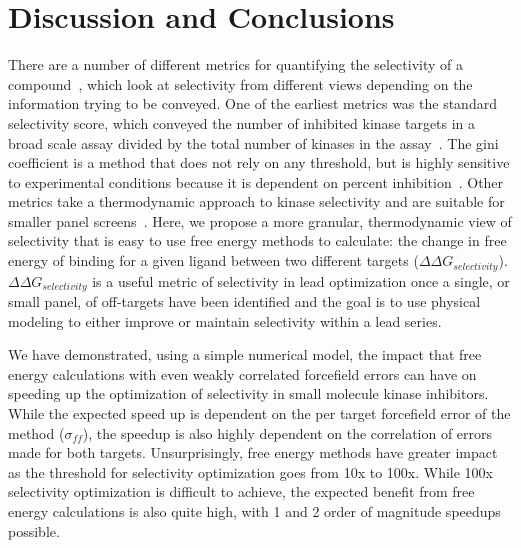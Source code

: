 \documentclass[9pt,lineno]{elife-modified} %
\begin{document}
\section{Discussion and Conclusions}
There are a number of different metrics for quantifying the selectivity of a compound~\citep{Bosc:2017gs}, which look at selectivity from different views depending on the information trying to be conveyed. One of the earliest metrics was the standard selectivity score, which conveyed the number of inhibited kinase targets in a broad scale assay divided by the total number of kinases in the assay~\citep{Davis2011-dz}. The gini coefficient is a method that does not rely on any threshold, but is highly sensitive to experimental conditions because it is dependent on percent inhibition~\citep{Graczyk:2007bm}. Other metrics take a thermodynamic approach to kinase selectivity and are suitable for smaller panel screens~\citep{DuongLy:2016iha,Uitdehaag:2011ea}. Here, we propose a more granular, thermodynamic  view of selectivity that is easy to use free energy methods to calculate: the change in free energy of binding for a given ligand between two different targets ($\Delta \Delta G_{selectivity}$). $\Delta \Delta G_{selectivity}$ is a useful metric of selectivity in lead optimization once a single, or small panel, of off-targets have been identified and the goal is to use physical modeling to either improve or maintain selectivity within a lead series. 

We have demonstrated, using a simple numerical model, the impact that free energy calculations with even weakly correlated forcefield errors can have on speeding up the optimization of selectivity in small molecule kinase inhibitors. While the expected speed up is dependent on the per target forcefield error of the method ($\sigma_{ff}$), the speedup is also highly dependent on the correlation of errors made for both targets. Unsurprisingly, free energy methods have greater impact as the threshold for selectivity optimization goes from 10x to 100x. While 100x selectivity optimization is difficult to achieve, the expected benefit from free energy calculations is also quite high, with 1 and 2 order of magnitude speedups possible. 
\end{document}
